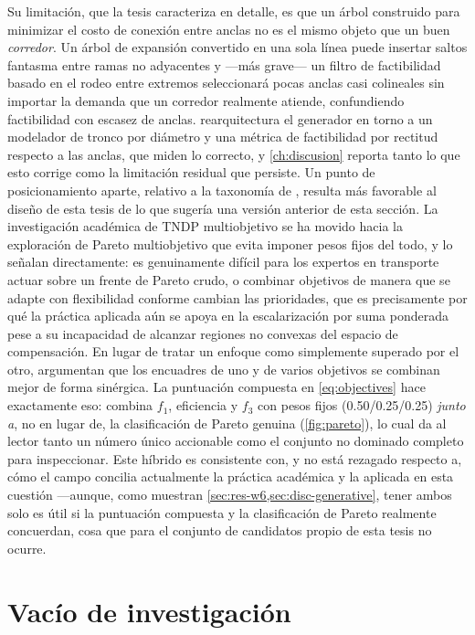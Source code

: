 Su limitación, que la tesis caracteriza en detalle, es que un árbol construido para
minimizar el costo de conexión entre anclas no es el mismo objeto que un buen
\emph{corredor}. Un árbol de expansión convertido en una sola línea puede insertar saltos
fantasma entre ramas no adyacentes y ---más grave--- un filtro de factibilidad basado en el
rodeo entre extremos seleccionará pocas anclas casi colineales sin importar la demanda que
un corredor realmente atiende, confundiendo factibilidad con escasez de anclas.
 rearquitectura el generador en torno a un modelador de tronco por diámetro y
una métrica de factibilidad por rectitud respecto a las anclas, que miden lo correcto, y
\cref{ch:discusion} reporta tanto lo que esto corrige como la limitación residual que
persiste. Un punto de posicionamiento aparte, relativo a la taxonomía de
\textcite{kepaptsoglou2009review}, resulta más favorable al diseño de esta tesis de lo que
sugería una versión anterior de esta sección. La investigación académica de TNDP
multiobjetivo se ha movido hacia la exploración de Pareto multiobjetivo que evita imponer
pesos fijos del todo, y \textcite{silva2022mo} lo señalan directamente: es genuinamente
difícil para los expertos en transporte actuar sobre un frente de Pareto crudo, o combinar
objetivos de manera que se adapte con flexibilidad conforme cambian las prioridades, que es
precisamente por qué la práctica aplicada aún se apoya en la escalarización por suma
ponderada pese a su incapacidad de alcanzar regiones no convexas del espacio de
compensación. En lugar de tratar un enfoque como simplemente superado por el otro,
\textcite{silva2022mo} argumentan que los encuadres de uno y de varios objetivos se
combinan mejor de forma sinérgica. La puntuación compuesta en \cref{eq:objectives} hace
exactamente eso: combina $f_1$, eficiencia y $f_3$ con pesos fijos (0.50/0.25/0.25)
\emph{junto a}, no en lugar de, la clasificación de Pareto genuina (\cref{fig:pareto}), lo
cual da al lector tanto un número único accionable como el conjunto no dominado completo
para inspeccionar. Este híbrido es consistente con, y no está rezagado respecto a, cómo el
campo concilia actualmente la práctica académica y la aplicada en esta cuestión ---aunque,
como muestran \cref{sec:res-w6,sec:disc-generative}, tener ambos solo es útil si la
puntuación compuesta y la clasificación de Pareto realmente concuerdan, cosa que para el
conjunto de candidatos propio de esta tesis no ocurre.

\section{Vacío de investigación}
\label{sec:marco-vacio}

